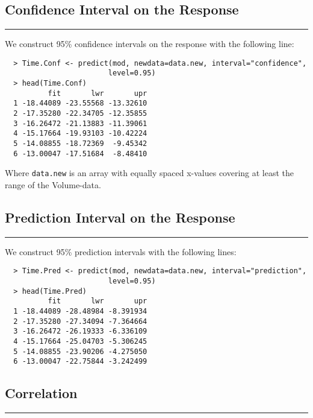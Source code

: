 \subsection{Confidence Interval on the Response}
\noindent\rule[\linienAbstand]{\linewidth}{\linienDicke}
We construct 95\% confidence intervals on the response with the following line:
\begingroup
\scriptsize
\begin{verbatim}
  > Time.Conf <- predict(mod, newdata=data.new, interval="confidence",
                        level=0.95)
  > head(Time.Conf)
          fit       lwr       upr
  1 -18.44089 -23.55568 -13.32610
  2 -17.35280 -22.34705 -12.35855
  3 -16.26472 -21.13883 -11.39061
  4 -15.17664 -19.93103 -10.42224
  5 -14.08855 -18.72369  -9.45342
  6 -13.00047 -17.51684  -8.48410

\end{verbatim}
\endgroup
Where \texttt{data.new} is an array with equally spaced x-values covering at least the range of the Volume-data.\\

\subsection{Prediction Interval on the Response}
\noindent\rule[\linienAbstand]{\linewidth}{\linienDicke}
We construct 95\% prediction intervals with the following lines:
\begingroup
\scriptsize
\begin{verbatim}
  > Time.Pred <- predict(mod, newdata=data.new, interval="prediction",
                        level=0.95)
  > head(Time.Pred)
          fit       lwr       upr
  1 -18.44089 -28.48984 -8.391934
  2 -17.35280 -27.34094 -7.364664
  3 -16.26472 -26.19333 -6.336109
  4 -15.17664 -25.04703 -5.306245
  5 -14.08855 -23.90206 -4.275050
  6 -13.00047 -22.75844 -3.242499

\end{verbatim}
\endgroup

\subsection{Correlation}
\noindent\rule[\linienAbstand]{\linewidth}{\linienDicke}

